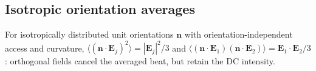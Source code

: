 \subsection{Isotropic orientation averages}\label{supp:orientation}
For isotropically distributed unit orientations
$\mathbf n$ with orientation-independent access and curvature,
$\langle(\mathbf n\cdot\mathbf E_j)^2\rangle=|\mathbf E_j|^2/3$
and $\langle(\mathbf n\cdot\mathbf E_1)(\mathbf n\cdot\mathbf E_2)\rangle
=\mathbf E_1\cdot\mathbf E_2/3$: orthogonal fields cancel the averaged beat,
but retain the DC intensity.
